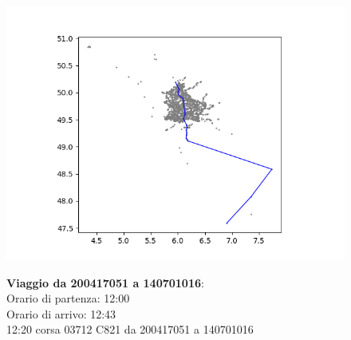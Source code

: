 \documentclass{article}
\begin{document}
\begin{figure}[H]
	\begin{minipage}{0.55\linewidth}
		\centering
		\hspace*{-3cm}\includegraphics[width=1.0\linewidth, valign=t]{figures/Figure_1}
	\end{minipage}
	\hspace*{-2cm}\begin{minipage}{0.7\linewidth}
		\textbf{Viaggio da 200417051 a 140701016}:\\
		Orario di partenza: 12:00\\
		Orario di arrivo: 12:43\\
		12:20 corsa 03712 C821 da 200417051 a 140701016
		
			\end{minipage}
\end{figure}
\end{document}
